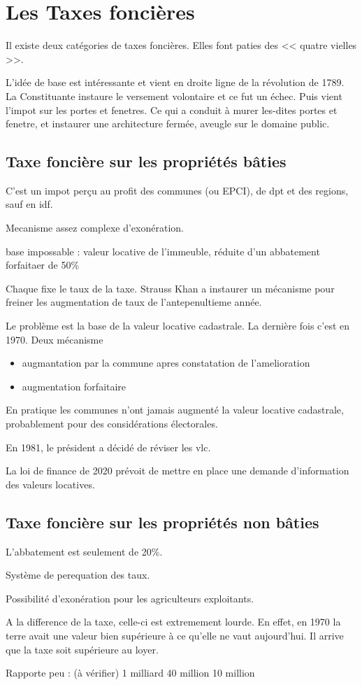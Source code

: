 \chapter{Les Taxes foncières}

	Il existe deux catégories de taxes foncières. Elles font paties des << quatre vielles >>.

	L'idée de base est intéressante et vient en droite ligne de la révolution de 1789. La Constituante instaure le versement volontaire et ce fut un échec.
	Puis vient l'impot sur les portes et fenetres. Ce qui a conduit à murer les-dites portes et fenetre, et instaurer une architecture fermée, aveugle sur le domaine public.

	\section{Taxe foncière sur les propriétés bâties}

		C'est un impot perçu au profit des communes (ou EPCI), de dpt et des regions, sauf en idf.

		Mecanisme assez complexe d'exonération.

		base impossable : valeur locative de l'immeuble, réduite d'un abbatement forfaitaer de 50\%

		Chaque \colloc* fixe le taux de la taxe. Strauss Khan a instaurer un mécanisme pour freiner les augmentation de taux de l'antepenultieme année.

		Le problème est la base de la valeur locative cadastrale. La dernière fois c'est en 1970.
		Deux mécanisme
		\begin{itemize}
			\item augmantation par la commune apres constatation de l'amelioration
			\item augmentation forfaitaire
		\end{itemize}
		En pratique les communes n'ont jamais augmenté la valeur locative cadastrale, probablement pour des considérations électorales.

		En 1981, le président  a décidé de réviser les vlc.

		La loi de finance de 2020 prévoit de mettre en place une demande d'information des valeurs locatives.

	\section{Taxe foncière sur les propriétés non bâties}

		L'abbatement est seulement de 20\%.

		Système de perequation des taux.

		Possibilité d'exonération pour les agriculteurs exploitants.

		A la difference de la taxe, celle-ci est extremement lourde. En effet, en 1970 la terre avait une valeur bien supérieure à ce qu'elle ne vaut aujourd'hui. Il arrive que la taxe soit supérieure au loyer.

		Rapporte peu : (à vérifier)
		1 milliard
		40 million
		10 million
